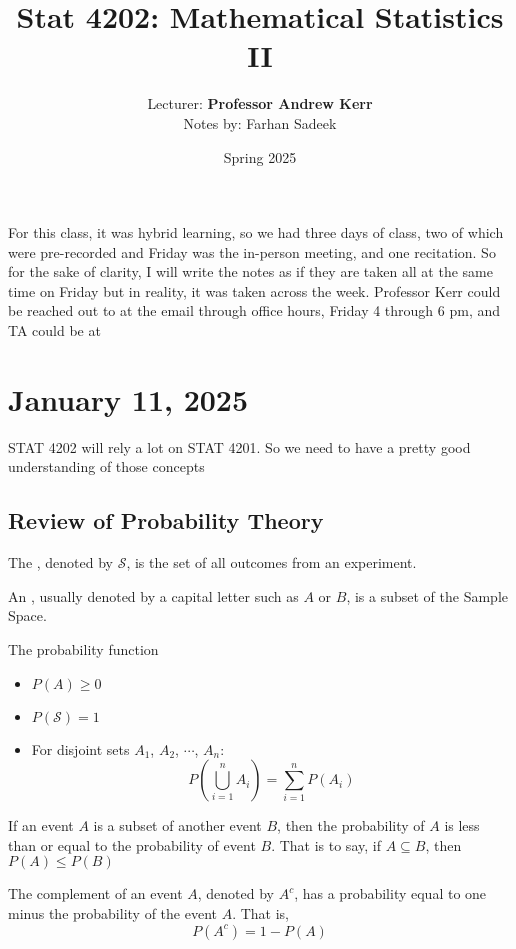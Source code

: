 \documentclass[11pt]{article}
\title{Stat 4202: Mathematical Statistics II}
\author{Lecturer: \textbf{Professor Andrew Kerr}\\Notes by: Farhan Sadeek}
\date{Spring 2025}
\begin{document}
\maketitle

For this class, it was hybrid learning, so we had three days of class, two of which were pre-recorded and Friday was the in-person meeting, and one recitation. So for the sake of clarity, I will write the notes as if they are taken all at the same time on Friday but in reality, it was taken across the week. Professor Kerr could be reached out to at the email through office hours, Friday 4 through 6 pm, and TA could be at

\section{January 11, 2025}
STAT 4202 will rely a lot on STAT 4201. So we need to have a pretty good
understanding of those concepts

\subsection{Review of Probability Theory}
\begin{definition}
	The , denoted by $\mathcal{S}$, is the set of all outcomes from an experiment.
\end{definition}

\begin{definition}
	An , usually denoted by a capital letter such as $A$ or $B$, is a subset of the Sample Space.
\end{definition}

The probability function
\begin{itemize}
	\item $P(A) \geq 0$
	\item $P(\mathcal{S}) = 1$
	\item For disjoint sets $A_1$, $A_2$, $\cdots$, $A_n$: \[ P\left(\bigcup_{i = 1}^{n}A_i \right) = \sum_{i = 1}^{n} P(A_i)\]
\end{itemize}

If an event $A$ is a subset of another event $B$, then the probability of $A$
is less than or equal to the probability of event $B$. That is to say, if $A
	\subseteq B$, then \( P(A) \leq P(B)\)

The complement of an event $A$, denoted by $A^c$, has a probability equal to
one minus the probability of the event $A$. That is,
\[ P(A^c) = 1 - P(A) \]
\end{document}
